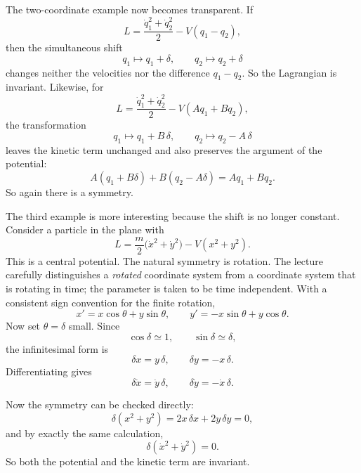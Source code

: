 The two-coordinate example now becomes transparent. If
\begin{equation}
L=\frac{\dot q_1^2+\dot q_2^2}{2}-V(q_1-q_2),
\end{equation}
then the simultaneous shift
\begin{equation}
q_1\mapsto q_1+\delta,
\qquad
q_2\mapsto q_2+\delta
\end{equation}
changes neither the velocities nor the difference \(q_1-q_2\). So the Lagrangian is invariant. Likewise, for
\begin{equation}
L=\frac{\dot q_1^2+\dot q_2^2}{2}-V(Aq_1+Bq_2),
\end{equation}
the transformation
\begin{equation}
q_1\mapsto q_1+B\,\delta,
\qquad
q_2\mapsto q_2-A\,\delta
\end{equation}
leaves the kinetic term unchanged and also preserves the argument of the potential:
\begin{equation}
A(q_1+B\delta)+B(q_2-A\delta)=Aq_1+Bq_2.
\end{equation}
So again there is a symmetry.

The third example is more interesting because the shift is no longer constant. Consider a particle in the plane with
\begin{equation}
L=\frac{m}{2}\big(\dot x^2+\dot y^2\big)-V(x^2+y^2).
\end{equation}
This is a central potential. The natural symmetry is rotation. The lecture carefully distinguishes a \emph{rotated} coordinate system from a coordinate system that is rotating in time; the parameter is taken to be time independent. With a consistent sign convention for the finite rotation,
\begin{equation}
x'=x\cos\theta+y\sin\theta,
\qquad
y'=-x\sin\theta+y\cos\theta.
\end{equation}
Now set \(\theta=\delta\) small. Since
\begin{equation}
\cos\delta \simeq 1,
\qquad
\sin\delta \simeq \delta,
\end{equation}
the infinitesimal form is
\begin{equation}
\delta x=y\,\delta,
\qquad
\delta y=-x\,\delta.
\end{equation}
Differentiating gives
\begin{equation}
\delta\dot x=\dot y\,\delta,
\qquad
\delta\dot y=-\dot x\,\delta.
\end{equation}

Now the symmetry can be checked directly:
\begin{equation}
\delta(x^2+y^2)=2x\,\delta x+2y\,\delta y=0,
\end{equation}
and by exactly the same calculation,
\begin{equation}
\delta(\dot x^2+\dot y^2)=0.
\end{equation}
So both the potential and the kinetic term are invariant.

